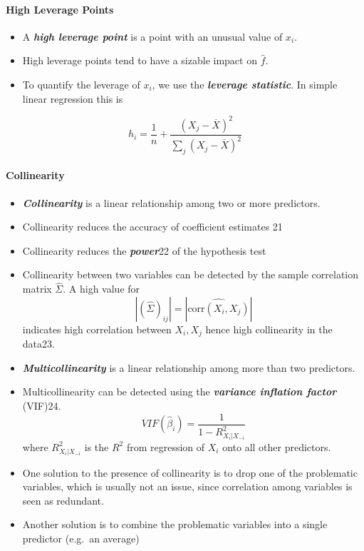 \documentclass[11pt]{article}
\begin{document}
    \hypertarget{high-leverage-points}{%
\paragraph{High Leverage Points}\label{high-leverage-points}}

    \begin{itemize}
\item
  A \textbf{\emph{high leverage point}} is a point with an unusual value
  of \(x_i\).
\item
  High leverage points tend to have a sizable impact on \(\hat{f}\).
\item
  To quantify the leverage of \(x_i\), we use the \textbf{\emph{leverage
  statistic}}. In simple linear regression this is
\end{itemize}

\[ h_i = \frac{1}{n} + \frac{(X_j - \overline{X})^2}{\sum_{j} (X_{j} - \overline{X})^2} \]

    \hypertarget{collinearity}{%
\paragraph{Collinearity}\label{collinearity}}

    \begin{itemize}
\item
  \textbf{\emph{Collinearity}} is a linear relationship among two or
  more predictors.
\item
  Collinearity reduces the accuracy of coefficient estimates 21
\item
  Collinearity reduces the \textbf{\emph{power}}22 of the hypothesis
  test
\item
  Collinearity between two variables can be detected by the sample
  correlation matrix \(\hat{\Sigma}\). A high value for
  \[|(\hat{\Sigma})_{ij}| = |\hat{\text{corr}(X_i, X_j)}|\] indicates
  high correlation between \(X_i, X_j\) hence high collinearity in the
  data23.
\item
  \textbf{\emph{Multicollinearity}} is a linear relationship among more
  than two predictors.
\item
  Multicollinearity can be detected using the \textbf{\emph{variance
  inflation factor}} (VIF)24.
  \[ VIF(\hat{\beta}_i) = \frac{1}{1-R^2_{X_i|X_{-i}}}\] where
  \(R^2_{X_i|X_{-i}}\) is the \(R^2\) from regression of \(X_i\) onto
  all other predictors.
\item
  One solution to the presence of collinearity is to drop one of the
  problematic variables, which is usually not an issue, since
  correlation among variables is seen as redundant.
\item
  Another solution is to combine the problematic variables into a single
  predictor (e.g.~an average)
\end{itemize}
\end{document}
